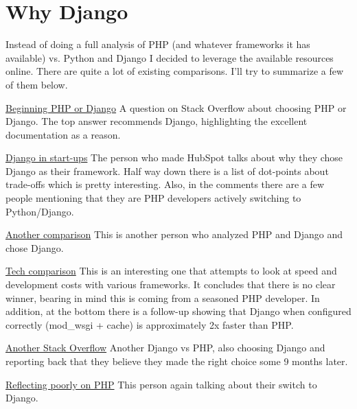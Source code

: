 \documentclass[12pt]{article}
\begin{document}
\maketitle

\section{Why Django}

Instead of doing a full analysis of PHP (and whatever frameworks it has available) vs. Python
and Django I decided to leverage the available resources online. There are quite a lot of
existing comparisons. I'll try to summarize a few of them below.

\begin{description}
\item \href{http://stackoverflow.com/questions/5285035/beginner-friendly-php-or-django}{Beginning PHP or Django} A question on Stack Overflow about choosing PHP or Django. The top answer
recommends Django, highlighting the excellent documentation as a reason.
\item \href{http://onstartups.com/tabid/3339/bid/20493/Why-PHP-Is-Fun-and-Easy-But-Python-Is-Marriage-Material.aspx}{Django in start-ups} The person who made HubSpot talks about why they
chose Django as their framework. Half way down there is a list of dot-points about trade-offs
which is pretty interesting. Also, in the comments there are a few people mentioning that they
are PHP developers actively switching to Python/Django.
\item \href{http://chriskief.com/2012/12/14/time-for-a-switch-php-symfony2-vs-python-django/}{Another comparison} This is another person who analyzed PHP and Django and chose Django.
\item \href{http://blog.sznapka.pl/modern-frameworks-comparison/}{Tech comparison} This is
an interesting one that attempts to look at speed and development costs with various frameworks.
It concludes that there is no clear winner, bearing in mind this is coming from a seasoned
PHP developer. In addition, at the bottom there is a follow-up showing that Django when
configured correctly (mod\_wsgi + cache) is approximately 2x faster than PHP.
\item \href{http://stackoverflow.com/questions/1852876/django-vs-phpframework}{Another Stack Overflow} Another Django vs PHP, also choosing Django and reporting back that they believe
they made the right choice some 9 months later.
\item \href{http://techblog.stickyworld.com/abandoning-php-for-python.html}{Reflecting poorly on PHP} This person again talking about their switch to Django.

\end{description}
\end{document}
